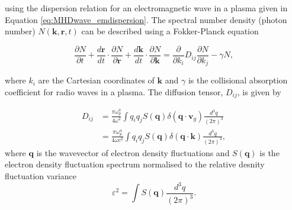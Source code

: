 using the dispersion relation for an electromagnetic wave in a plasma given in Equation \ref{eq:MHDwave_emdispersion}. The spectral number density (photon number) $N(\mathbf{k}, \mathbf{r}, t)$ can be described using a Fokker-Planck equation

\begin{equation}
\label{eq:scattering_Fokker_Planck}
\frac{\partial N}{\partial t} +\frac{d \mathbf{r}}{dt} \cdot \frac{\partial N}{\partial \mathbf{r}} + \frac{d \mathbf{k}}{dt} \cdot \frac{\partial N}{\partial \mathbf{k}} = \frac{\partial}{\partial k_i} D_{ij} \frac{\partial N}{\partial k_j} - \gamma N,
\end{equation}

where $k_i$ are the Cartesian coordinates of $\mathbf{k}$ and $\gamma$ is the collisional absorption coefficient for radio waves in a plasma. The diffusion tensor, $D_{ij}$, is given by

\begin{equation}
\label{eq:scattering_diffusion_tensor}
\begin{aligned}
D_{ij} &= \frac{\pi \omega_p^4}{4 \omega^2} \int q_i q_j S(\mathbf{q}) \delta(\mathbf{q} \cdot \mathbf{v}_g) \frac{d^3 q}{(2 \pi)^3} \\
&= \frac{\pi \omega_p^4}{4 \omega c^2} \int q_i q_j S(\mathbf{q}) \delta(\mathbf{q} \cdot \mathbf{k}) \frac{d^3 q}{(2 \pi)^3},
\end{aligned}
\end{equation}
where $\mathbf{q}$ is the wavevector of electron density fluctuations and $S(\mathbf{q})$ is the electron density fluctuation spectrum normalised to the relative desnity fluctuation variance
\begin{equation}
\varepsilon^2 = \int S(\mathbf{q})  \frac{d^3 q}{(2 \pi)^3}.
\end{equation}

